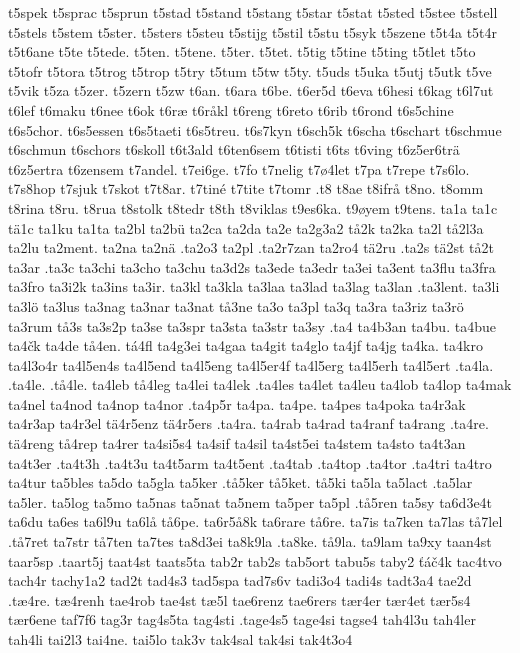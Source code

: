 {{t5spek
t5sprac
t5sprun
t5stad
t5stand
t5stang
t5star
t5stat
t5sted
t5stee
t5stell
t5stels
t5stem
t5ster.
t5sters
t5steu
t5stijg
t5stil
t5stu
t5syk
t5szene
t5t4a
t5t4r
t5t6ane
t5te
t5tede.
t5ten.
t5tene.
t5ter.
t5tet.
t5tig
t5tine
t5ting
t5tlet
t5to
t5tofr
t5tora
t5trog
t5trop
t5try
t5tum
t5tw
t5ty.
t5uds
t5uka
t5utj
t5utk
t5ve
t5vik
t5za
t5zer.
t5zern
t5zw
t6an.
t6ara
t6be.
t6er5d
t6eva
t6hesi
t6kag
t6l7ut
t6lef
t6maku
t6nee
t6ok
t6ræ
t6råkl
t6reng
t6reto
t6rib
t6rond
t6s5chine
t6s5chor.
t6s5essen
t6s5taeti
t6s5treu.
t6s7kyn
t6sch5k
t6scha
t6schart
t6schmue
t6schmun
t6schors
t6skoll
t6t3ald
t6ten6sem
t6tisti
t6ts
t6ving
t6z5er6trä
t6z5ertra
t6zensem
t7andel.
t7ei6ge.
t7fo
t7nelig
t7ø4let
t7pa
t7repe
t7s6lo.
t7s8hop
t7sjuk
t7skot
t7t8ar.
t7tiné
t7tite
t7tomr
.t8
t8ae
t8ifrå
t8no.
t8omm
t8rina
t8ru.
t8rua
t8stolk
t8tedr
t8th
t8viklas
t9es6ka.
t9øyem
t9tens.
ta1a
ta1c
tä1c
ta1ku
ta1ta
ta2bl
ta2bü
ta2ca
ta2da
ta2e
ta2g3a2
tå2k
ta2ka
ta2l
tå2l3a
ta2lu
ta2ment.
ta2na
ta2nä
.ta2o3
ta2pl
.ta2r7zan
ta2ro4
tä2ru
.ta2s
tä2st
tå2t
ta3ar
.ta3c
ta3chi
ta3cho
ta3chu
ta3d2s
ta3ede
ta3edr
ta3ei
ta3ent
ta3flu
ta3fra
ta3fro
ta3i2k
ta3ins
ta3ir.
ta3kl
ta3kla
ta3laa
ta3lad
ta3lag
ta3lan
.ta3lent.
ta3li
ta3lö
ta3lus
ta3nag
ta3nar
ta3nat
tå3ne
ta3o
ta3pl
ta3q
ta3ra
ta3riz
ta3rö
ta3rum
tå3s
ta3s2p
ta3se
ta3spr
ta3sta
ta3str
ta3sy
.ta4
ta4b3an
ta4bu.
ta4bue
ta4čk
ta4de
tå4en.
tá4fl
ta4g3ei
ta4gaa
ta4git
ta4glo
ta4jf
ta4jg
ta4ka.
ta4kro
ta4l3o4r
ta4l5en4s
ta4l5end
ta4l5eng
ta4l5er4f
ta4l5erg
ta4l5erh
ta4l5ert
.ta4la.
.ta4le.
.tå4le.
ta4leb
tå4leg
ta4lei
ta4lek
.ta4les
ta4let
ta4leu
ta4lob
ta4lop
ta4mak
ta4nel
ta4nod
ta4nop
ta4nor
.ta4p5r
ta4pa.
ta4pe.
ta4pes
ta4poka
ta4r3ak
ta4r3ap
ta4r3el
tä4r5enz
tä4r5ers
.ta4ra.
ta4rab
ta4rad
ta4ranf
ta4rang
.ta4re.
tä4reng
tå4rep
ta4rer
ta4si5s4
ta4sif
ta4sil
ta4st5ei
ta4stem
ta4sto
ta4t3an
ta4t3er
.ta4t3h
.ta4t3u
ta4t5arm
ta4t5ent
.ta4tab
.ta4top
.ta4tor
.ta4tri
ta4tro
ta4tur
ta5bles
ta5do
ta5gla
ta5ker
.tå5ker
tå5ket.
tå5ki
ta5la
ta5lact
.ta5lar
ta5ler.
ta5log
ta5mo
ta5nas
ta5nat
ta5nem
ta5per
ta5pl
.tå5ren
ta5sy
ta6d3e4t
ta6du
ta6es
ta6l9u
ta6lå
tå6pe.
ta6r5å8k
ta6rare
tå6re.
ta7is
ta7ken
ta7las
tå7lel
.tå7ret
ta7str
tå7ten
ta7tes
ta8d3ei
ta8k9la
.ta8ke.
tå9la.
ta9lam
ta9xy
taan4st
taar5sp
.taart5j
taat4st
taats5ta
tab2r
tab2s
tab5ort
tabu5s
taby2
ťáč4k
tac4tvo
tach4r
tachy1a2
tad2t
tad4s3
tad5spa
tad7s6v
tadi3o4
tadi4s
tadt3a4
tae2d
.tæ4re.
tæ4renh
tae4rob
tae4st
tæ5l
tae6renz
tae6rers
tær4er
tær4et
tær5s4
tær6ene
taf7f6
tag3r
tag4s5ta
tag4sti
.tage4s5
tage4si
tagse4
tah4l3u
tah4ler
tah4li
tai2l3
tai4ne.
tai5lo
tak3v
tak4sal
tak4si
tak4t3o4
}}
